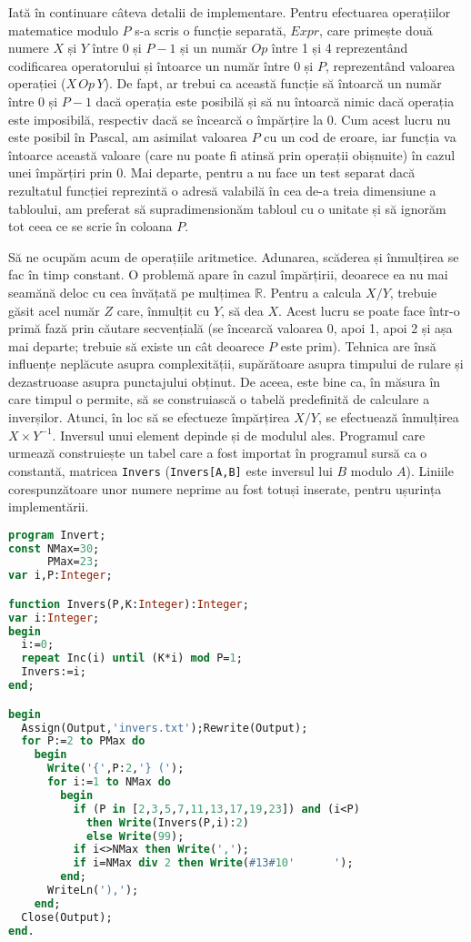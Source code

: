 Iată în continuare câteva detalii de implementare. Pentru efectuarea
operațiilor matematice modulo $P$ s-a scris o funcție separată, $Expr$, care
primește două numere $X$ și $Y$ între 0 și $P-1$ și un număr $Op$ între 1 și 4
reprezentând codificarea operatorului și întoarce un număr între 0 și $P$,
reprezentând valoarea operației ($X\,Op\,Y$). De fapt, ar trebui ca această
funcție să întoarcă un număr între 0 și $P-1$ dacă operația este posibilă și
să nu întoarcă nimic dacă operația este imposibilă, respectiv dacă se încearcă
o împărțire la 0. Cum acest lucru nu este posibil în Pascal, am asimilat
valoarea $P$ cu un cod de eroare, iar funcția va întoarce această valoare
(care nu poate fi atinsă prin operații obișnuite) în cazul unei împărțiri prin
0. Mai departe, pentru a nu face un test separat dacă rezultatul funcției
reprezintă o adresă valabilă în cea de-a treia dimensiune a tabloului, am
preferat să supradimensionăm tabloul cu o unitate și să ignorăm tot ceea ce se
scrie în coloana $P$.

Să ne ocupăm acum de operațiile aritmetice. Adunarea, scăderea și înmulțirea
se fac în timp constant. O problemă apare în cazul împărțirii, deoarece ea nu
mai seamănă deloc cu cea învățată pe mulțimea $\mathbb{R}$. Pentru a calcula
$X/Y$, trebuie găsit acel număr $Z$ care, înmulțit cu $Y$, să dea $X$. Acest
lucru se poate face într-o primă fază prin căutare secvențială (se încearcă
valoarea 0, apoi 1, apoi 2 și așa mai departe; trebuie să existe un cât
deoarece $P$ este prim). Tehnica are însă influențe neplăcute asupra
complexității, supărătoare asupra timpului de rulare și dezastruoase asupra
punctajului obținut. De aceea, este bine ca, în măsura în care timpul o
permite, să se construiască o tabelă predefinită de calculare a
inverșilor. Atunci, în loc să se efectueze împărțirea $X/Y$, se efectuează
înmulțirea $X \times Y^{-1}$. Inversul unui element depinde și de modulul
ales. Programul care urmează construiește un tabel care a fost importat în
programul sursă ca o constantă, matricea {\tt Invers} ({\tt Invers[A,B]} este
inversul lui $B$ modulo $A$). Liniile corespunzătoare unor numere neprime au
fost totuși inserate, pentru ușurința implementării.

\begin{lstlisting}[language=Pascal]
program Invert;
const NMax=30;
      PMax=23;
var i,P:Integer;

function Invers(P,K:Integer):Integer;
var i:Integer;
begin
  i:=0;
  repeat Inc(i) until (K*i) mod P=1;
  Invers:=i;
end;

begin
  Assign(Output,'invers.txt');Rewrite(Output);
  for P:=2 to PMax do
    begin
      Write('{',P:2,'} (');
      for i:=1 to NMax do
        begin
          if (P in [2,3,5,7,11,13,17,19,23]) and (i<P)
            then Write(Invers(P,i):2)
            else Write(99);
          if i<>NMax then Write(',');
          if i=NMax div 2 then Write(#13#10'      ');
        end;
      WriteLn('),');
    end;
  Close(Output);
end.
\end{lstlisting}

